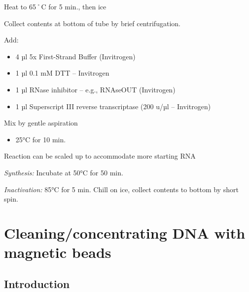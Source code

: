 \documentclass[
  letterpaper,
  DIV=11,
  numbers=noendperiod]{scrreprt}
\providecommand{\tightlist}{%
  \setlength{\itemsep}{0pt}\setlength{\parskip}{0pt}}\usepackage{longtable,booktabs,array}
\begin{document}
Heat to 65˚C for 5 min., then ice

Collect contents at bottom of tube by brief centrifugation.

Add:

\begin{itemize}
\tightlist
\item
  4 µl 5x First-Strand Buffer (Invitrogen)
\item
  1 µl 0.1 mM DTT -- Invitrogen
\item
  1 µl RNase inhibitor -- e.g., RNAseOUT (Invitrogen)
\item
  1 µl Superscript III reverse transcriptase (200 u/µl -- Invitrogen)
\end{itemize}

Mix by gentle aspiration

\begin{itemize}
\tightlist
\item
  25°C for 10 min.
\end{itemize}

\begin{tcolorbox}[enhanced jigsaw, rightrule=.15mm, title=\textcolor{quarto-callout-warning-color}{\faExclamationTriangle}\hspace{0.5em}{NOTES}, titlerule=0mm, opacitybacktitle=0.6, toprule=.15mm, bottomrule=.15mm, opacityback=0, left=2mm, colframe=quarto-callout-warning-color-frame, breakable, coltitle=black, colback=white, colbacktitle=quarto-callout-warning-color!10!white, bottomtitle=1mm, leftrule=.75mm, toptitle=1mm, arc=.35mm]

Reaction can be scaled up to accommodate more starting RNA

\end{tcolorbox}

\emph{Synthesis:} Incubate at 50°C for 50 min.

\emph{Inactivation:} 85°C for 5 min. Chill on ice, collect contents to
bottom by short spin.

\hypertarget{sec-molecular-bead_extraction_dup}{%
\chapter{Cleaning/concentrating DNA with magnetic
beads}\label{sec-molecular-bead_extraction_dup}}

\hypertarget{introduction-19}{%
\section{Introduction}\label{introduction-19}}
\end{document}
